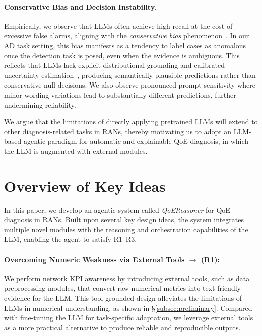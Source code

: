\documentclass[sigconf,10pt]{acmart} %
\begin{document}
\paragraph{Conservative Bias and Decision Instability.}
Empirically, we observe that LLMs often achieve high recall at the cost of excessive false alarms, aligning with the \emph{conservative bias} phenomenon~\cite{sriramanan2024llm, aguda2025conservative}. In our AD task setting, this bias manifests as a tendency to label cases as anomalous once the detection task is posed, even when the evidence is ambiguous.
This reflects that LLMs lack explicit distributional grounding and calibrated uncertainty estimation~\cite{reif2024beyond}, producing semantically plausible predictions rather than conservative null decisions.
We also observe pronounced prompt sensitivity where minor wording variations lead to substantially different predictions, further undermining reliability.


We argue that the limitations of directly applying pretrained LLMs will extend to other diagnosis-related tasks in RANs, thereby motivating us to adopt an LLM-based agentic paradigm for automatic and explainable QoE diagnosis, in which the LLM is augmented with external modules.

\section{Overview of Key Ideas}
\label{subsec:key-ideas}

In this paper, we develop an agentic system called \textit{QoEReasoner} for QoE diagnosis in RANs. Built upon several key design ideas, the system integrates multiple novel modules with the reasoning and orchestration capabilities of the LLM, enabling the agent to satisfy R1--R3.

\paragraph{Overcoming Numeric Weakness via External Tools $\rightarrow$ (R1): }
We perform network KPI awareness by introducing external tools, such as data preprocessing modules, that convert raw numerical metrics into text-friendly evidence for the LLM. This tool-grounded design alleviates the limitations of LLMs in numerical understanding, as shown in \S\ref{subsec:preliminary}. Compared with fine-tuning the LLM for task-specific adaptation, we leverage external tools as a more practical alternative to produce reliable and reproducible outputs.
\end{document}
